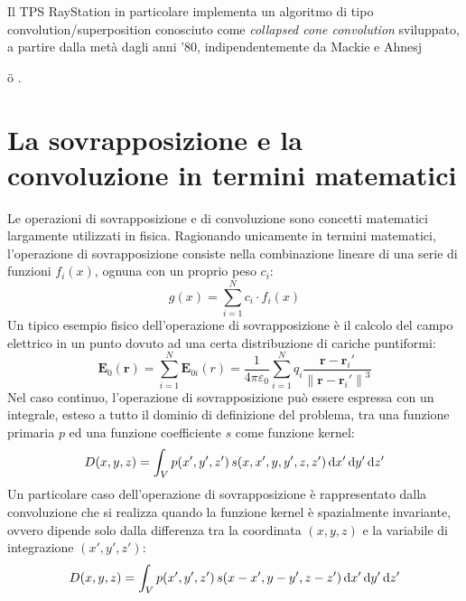 Il TPS RayStation in particolare implementa un algoritmo di tipo convolution/superposition conosciuto come \textit{collapsed cone convolution} sviluppato, a partire dalla metà dagli anni '80, indipendentemente da Mackie e Ahnesj{\"{o} \cite{Ahnesjo1989, Boyer1998, Mackie1985, Ahnesjo1987}.



\section{La sovrapposizione e la convoluzione in termini matematici}
Le operazioni di sovrapposizione e di convoluzione sono concetti matematici largamente utilizzati in fisica. Ragionando unicamente in termini matematici, l'operazione di sovrapposizione consiste nella combinazione lineare di una serie di funzioni $f_i(x)$, ognuna con un proprio peso $c_i$:
\begin{equation}
g(x) = \sum_{i=1}^{N} c_i\cdot f_i(x)
\end{equation}
Un tipico esempio fisico dell'operazione di sovrapposizione è il calcolo del campo elettrico in un punto dovuto ad una certa distribuzione di cariche puntiformi:
\begin{equation}
\mathbf E_0(\mathbf r) = \sum_{i=1}^N \mathbf E_{0i}(r) = \frac {1}{4 \pi \varepsilon_0} \sum_{i=1}^N q_i \frac {\mathbf r - \mathbf r_i'} {\left \| \mathbf r - \mathbf r_i' \right \|^3}
\end{equation}
Nel caso continuo, l'operazione di sovrapposizione può essere espressa con un integrale, esteso a tutto il dominio di definizione del problema, tra una funzione primaria $p$ ed una funzione coefficiente $s$ come funzione kernel:
\begin{equation}
\label{eq:sovrapp_math}
D(x,y,z) = \int_V p(x',y',z')\, s(x,x',y,y',z,z')\,\text{d} x' \,\text{d} y' \,\text{d} z'
\end{equation}
Un particolare caso dell'operazione di sovrapposizione è rappresentato dalla convoluzione che si realizza quando la funzione kernel è spazialmente invariante, ovvero dipende solo dalla differenza tra la coordinata $(x,y,z)$ e la variabile di integrazione $(x',y',z')$:
\begin{equation}
\label{eq:convol_math}
D(x,y,z) = \int_V p(x',y',z')\, s(x-x',y-y',z-z')\,\text{d} x' \,\text{d} y' \,\text{d} z'
\end{equation}


}
